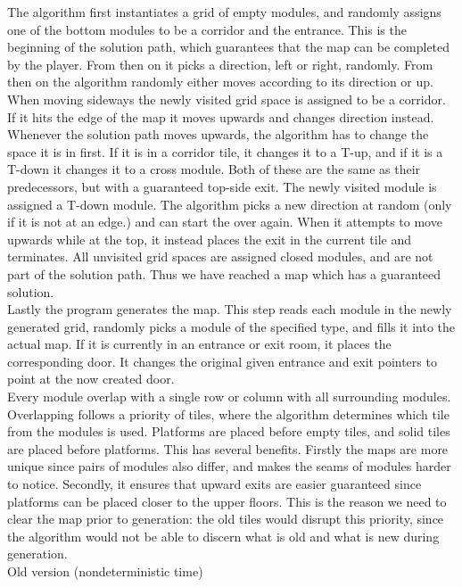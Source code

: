 The algorithm first instantiates a grid of empty modules, and randomly assigns one of the bottom modules to be a corridor and the entrance. This is the beginning of the solution path, which guarantees that the map can be completed by the player. From then on it picks a direction, left or right, randomly. From then on the algorithm randomly either moves according to its direction or up. When moving sideways the newly visited grid space is assigned to be a corridor. If it hits the edge of the map it moves upwards and changes direction instead. Whenever the solution path moves upwards, the algorithm has to change the space it is in first. If it is in a corridor tile, it changes it to a T-up, and if it is a T-down it changes it to a cross module. Both of these are the same as their predecessors, but with a guaranteed top-side exit. The newly visited module is assigned a T-down module. The algorithm picks a new direction at random (only if it is not at an edge.) and can start the over again. When it attempts to move upwards while at the top, it instead places the exit in the current tile and terminates. All unvisited grid spaces are assigned closed modules, and are not part of the solution path. Thus we have reached a map which has a guaranteed solution.\\
Lastly the program generates the map. This step reads each module in the newly generated grid, randomly picks a module of the specified type, and fills it into the actual map. If it is currently in an entrance or exit room, it places the corresponding door. It changes the original given entrance and exit pointers to
point at the now created door.\\
Every module overlap with a single row or column with all surrounding modules. Overlapping follows a priority of tiles, where the algorithm determines which tile from the modules is used. Platforms are placed before empty tiles, and solid tiles are placed before platforms. This has several benefits. Firstly the maps are more unique since pairs of modules also differ, and makes the seams of modules harder to notice. Secondly, it ensures that upward exits are easier guaranteed since platforms can be placed closer to the upper floors. This is the reason we need to clear the map prior to generation: the old tiles would disrupt this priority, since the algorithm would not be able to discern what is old and what is new during
generation.\\
Old version (nondeterministic time)

